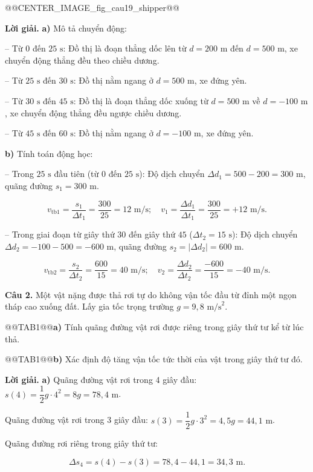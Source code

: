 \documentclass{article}
\begin{document}
@@CENTER_IMAGE_fig_cau19_shipper@@

\textbf{Lời giải.} \textbf{a)} Mô tả chuyển động:

-- Từ $0$ đến $25\text{ s}$: Đồ thị là đoạn thẳng dốc lên từ $d = 200\text{ m}$ đến $d = 500\text{ m}$, xe chuyển động thẳng đều theo chiều dương.

-- Từ $25\text{ s}$ đến $30\text{ s}$: Đồ thị nằm ngang ở $d = 500\text{ m}$, xe đứng yên.

-- Từ $30\text{ s}$ đến $45\text{ s}$: Đồ thị là đoạn thẳng dốc xuống từ $d = 500\text{ m}$ về $d = -100\text{ m}$, xe chuyển động thẳng đều ngược chiều dương.

-- Từ $45\text{ s}$ đến $60\text{ s}$: Đồ thị nằm ngang ở $d = -100\text{ m}$, xe đứng yên.

\textbf{b)} Tính toán động học:

-- Trong $25\text{ s}$ đầu tiên (từ $0$ đến $25\text{ s}$): Độ dịch chuyển $\Delta d_1 = 500 - 200 = 300\text{ m}$, quãng đường $s_1 = 300\text{ m}$.

\[v_{\text{tb}1} = \frac{s_1}{\Delta t_1} = \frac{300}{25} = 12\text{ m/s}; \quad v_1 = \frac{\Delta d_1}{\Delta t_1} = \frac{300}{25} = +12\text{ m/s}.\]

-- Trong giai đoạn từ giây thứ $30$ đến giây thứ $45$ ($\Delta t_2 = 15\text{ s}$): Độ dịch chuyển $\Delta d_2 = -100 - 500 = -600\text{ m}$, quãng đường $s_2 = |\Delta d_2| = 600\text{ m}$.

\[v_{\text{tb}2} = \frac{s_2}{\Delta t_2} = \frac{600}{15} = 40\text{ m/s}; \quad v_2 = \frac{\Delta d_2}{\Delta t_2} = \frac{-600}{15} = -40\text{ m/s}.\]

\textbf{Câu 2.} Một vật nặng được thả rơi tự do không vận tốc đầu từ đỉnh một ngọn tháp cao xuống đất. Lấy gia tốc trọng trường $g = 9{,}8\text{ m/s}^2$.

@@TAB1@@\textbf{a)} Tính quãng đường vật rơi được riêng trong giây thứ tư kể từ lúc thả.

@@TAB1@@\textbf{b)} Xác định độ tăng vận tốc tức thời của vật trong giây thứ tư đó.

\textbf{Lời giải.} \textbf{a)} Quãng đường vật rơi trong 4 giây đầu: $s(4) = \dfrac{1}{2}g \cdot 4^2 = 8g = 78{,}4\text{ m}$.

Quãng đường vật rơi trong 3 giây đầu: $s(3) = \dfrac{1}{2}g \cdot 3^2 = 4{,}5g = 44{,}1\text{ m}$.

Quãng đường rơi riêng trong giây thứ tư:

\[\Delta s_4 = s(4) - s(3) = 78{,}4 - 44{,}1 = 34{,}3\text{ m}.\]
\end{document}
